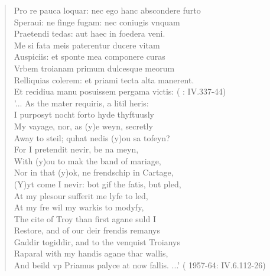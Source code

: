 \documentclass{dhbenelux}
\begin{document}
\begin{quote}
Pro re pauca loquar: nec ego hanc abscondere furto\\
Speraui: ne finge fugam: nec coniugis vnquam\\
Praetendi tedas: aut haec in foedera veni.\\
Me si fata meis paterentur ducere vitam\\
Auspiciis: et sponte mea componere curas\\
Vrbem troianam primum dulcesque meorum\\
Relliquias colerem: et priami tecta alta manerent.\\
Et recidiua manu posuissem pergama victis: (\citeauthor{virgil1501} \citeyear{virgil1501}: IV.337-44)\\

'... As the mater requiris, a litil heris:\\
I purposyt nocht forto hyde thyftuusly\\
My vayage, nor, as (y)e weyn, secretly\\
Away to steil; quhat nedis (y)ou sa tofeyn?\\
For I pretendit nevir, be na meyn,\\
With (y)ou to mak the band of mariage,\\
Nor in that (y)ok, ne frendschip in Cartage,\\
(Y)yt come I nevir: bot gif the fatis, but pled,\\
At my plesour sufferit me lyfe to led,\\
At my fre wil my warkis to modyfy,\\
The cite of Troy than first agane suld I\\
Restore, and of our deir frendis remanys\\
Gaddir togiddir, and to the venquist Troianys\\
Raparal with my handis agane thar wallis,\\
And beild vp Priamus palyce at now fallis. ...' (\citeauthor{douglas1957} 1957-64:
IV.6.112-26)
\end{quote}
\end{document}
